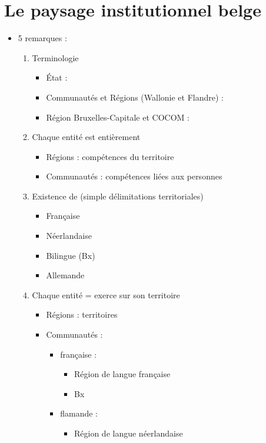 \section{Le paysage institutionnel belge}
\begin{itemize}
	\item 5 remarques :
	\begin{enumerate}
		\item Terminologie
		\begin{itemize}
			\item État : 
			\item Communautés et Régions (Wallonie et Flandre) : 
			\item Région Bruxelles-Capitale et COCOM : 
		\end{itemize}
		\item Chaque entité est entièrement 
		\begin{itemize}
			\item Régions : compétences du territoire
			\item Communautés : compétences liées aux personnes
		\end{itemize}
		\item Existence de  (simple délimitations territoriales)
		\begin{itemize}
			\item Française
			\item Néerlandaise
			\item Bilingue (Bx)
			\item Allemande
		\end{itemize}
		\item Chaque entité = exerce sur son territoire
		\begin{itemize}
			\item Régions : territoires
			\item Communautés :
			\begin{itemize}
				\item française :
				\begin{itemize}
					\item Région de langue française
					\item Bx
				\end{itemize}
				\item flamande :
				\begin{itemize}
					\item Région de langue néerlandaise

\end{itemize}
\end{itemize}
\end{itemize}
\end{enumerate}
\end{itemize}
